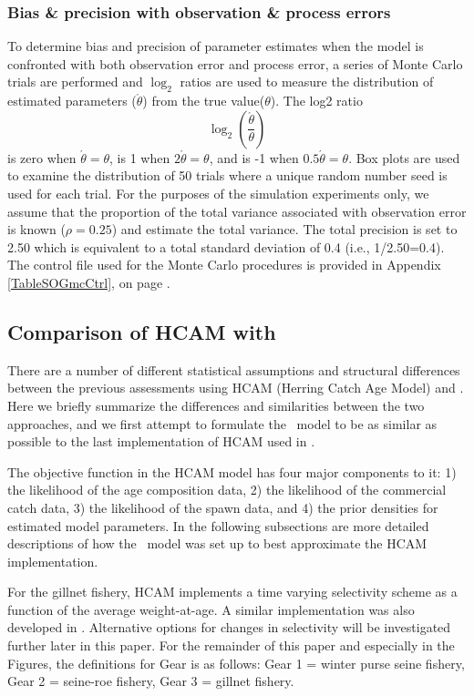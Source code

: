 		
		\subsubsection{Bias \& precision with observation \& process errors}
To determine bias and precision of parameter estimates when the model is confronted with both observation error and process error, a series of Monte Carlo trials are performed and $\log_2$ ratios are used to measure the distribution of estimated parameters ($\acute{\theta}$) from the true value($\theta$).  The log2 ratio
\[ \log_2\left(\frac{\acute{\theta}}{\theta}\right) \] is zero when $\acute{\theta}=\theta$, is 1 when $2\acute{\theta}=\theta$, and is -1 when $0.5\acute{\theta}=\theta$.  Box plots are used to examine the distribution of 50 trials where a unique random number seed is used for each trial.  For the purposes of the simulation experiments only, we assume that the proportion of the total variance associated with observation error is known ($\rho = 0.25$) and estimate the total variance.  The total precision is set to 2.50 which is equivalent to a total standard deviation of 0.4 (i.e., 1/2.50=0.4).  The control file used for the Monte Carlo procedures is provided in Appendix \ref{TableSOGmcCtrl}, on page \pageref{TableSOGmcCtrl}.


\subsection{Comparison of HCAM with \iscam}\label{secMethodsHCAM}
	
	There are a number of different statistical assumptions and structural differences between the previous assessments using HCAM (Herring Catch Age Model) and \iscam.	  Here we briefly summarize the differences and similarities between the two approaches, and we first attempt to formulate the \iscam\ model to be as similar as possible to the last implementation of HCAM used in \cite{Clear2010}.
	
	The objective function in the HCAM model has four major components to it: 1) the likelihood of the age composition data, 2) the likelihood of the commercial catch data, 3) the likelihood of the spawn data, and 4) the prior densities for estimated model parameters.  In the following subsections are more detailed descriptions of how the \iscam\ model was set up to best approximate the HCAM implementation.
	
	For the gillnet fishery, HCAM implements a time varying selectivity scheme as a function of the average weight-at-age. A similar implementation was also developed in \iscam. Alternative options for changes in selectivity will be investigated further later in this paper.  For the remainder of this paper and especially in the Figures, the definitions for Gear is as follows:  Gear 1 = winter purse seine fishery, Gear 2 = seine-roe fishery, Gear 3 = gillnet fishery.
	
